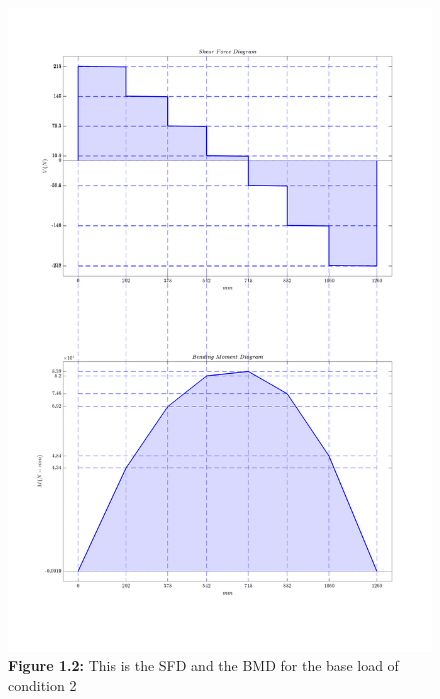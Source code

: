 \documentclass[12pt,titlepage,a4paper]{article}
\begin{document}
    \begin{figure}[H]
        \centering
        \includegraphics[width=13cm]{Delivery_1_SFD&FBD.png}
        \caption*{\textbf{Figure 1.2:} This is the SFD and the BMD for the base load of condition 2}
        \label{fig:enter-label}
    \end{figure}
\end{document}
